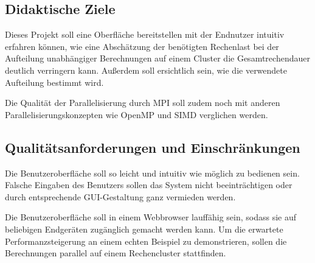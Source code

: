 \subsection{Didaktische Ziele}

Dieses Projekt soll eine Oberfläche bereitstellen mit der Endnutzer intuitiv erfahren können, wie
eine Abschätzung der benötigten Rechenlast bei der Aufteilung unabhängiger
Berechnungen auf einem Cluster die Gesamtrechendauer deutlich verringern kann.
Außerdem soll ersichtlich sein, wie die verwendete Aufteilung bestimmt wird.

Die Qualität der Parallelisierung durch MPI soll zudem noch mit anderen Parallelisierungskonzepten
wie OpenMP und SIMD verglichen werden.

\subsection{Qualitätsanforderungen und Einschränkungen}

Die Benutzeroberfläche soll so leicht und intuitiv wie möglich zu bedienen sein.
Falsche Eingaben des Benutzers sollen das System nicht beeinträchtigen oder durch entsprechende GUI-Gestaltung ganz vermieden werden.

Die Benutzeroberfläche soll in einem Webbrowser lauffähig sein, sodass sie auf beliebigen Endgeräten
zugänglich gemacht werden kann.
Um die erwartete Performanzsteigerung an einem echten Beispiel zu demonstrieren,
sollen die Berechnungen parallel auf einem Rechencluster stattfinden.




